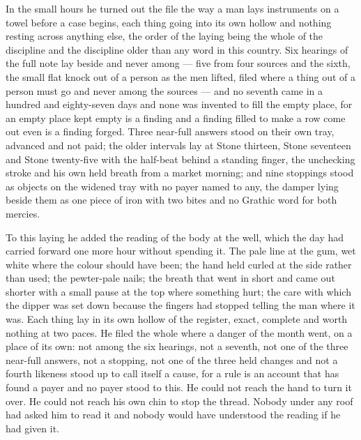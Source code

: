 \scenebreak

In the small hours he turned out the file the way a man lays instruments on a towel before a case begins, each thing going into its own hollow and nothing resting across anything else, the order of the laying being the whole of the discipline and the discipline older than any word in this country. Six hearings of the full note lay beside and never among --- five from four sources and the sixth, the small flat knock out of a person as the men lifted, filed where a thing out of a person must go and never among the sources --- and no seventh came in a hundred and eighty-seven days and none was invented to fill the empty place, for an empty place kept empty is a finding and a finding filled to make a row come out even is a finding forged. Three near-full answers stood on their own tray, advanced and not paid; the older intervals lay at Stone thirteen, Stone seventeen and Stone twenty-five with the half-beat behind a standing finger, the unchecking stroke and his own held breath from a market morning; and nine stoppings stood as objects on the widened tray with no payer named to any, the damper lying beside them as one piece of iron with two bites and no Grathic word for both mercies.

To this laying he added the reading of the body at the well, which the day had carried forward one more hour without spending it. The pale line at the gum, wet white where the colour should have been; the hand held curled at the side rather than used; the pewter-pale nails; the breath that went in short and came out shorter with a small pause at the top where something hurt; the care with which the dipper was set down because the fingers had stopped telling the man where it was. Each thing lay in its own hollow of the register, exact, complete and worth nothing at two paces. He filed the whole where a danger of the month went, on a place of its own: not among the six hearings, not a seventh, not one of the three near-full answers, not a stopping, not one of the three held changes and not a fourth likeness stood up to call itself a cause, for a rule is an account that has found a payer and no payer stood to this. He could not reach the hand to turn it over. He could not reach his own chin to stop the thread. Nobody under any roof had asked him to read it and nobody would have understood the reading if he had given it.

